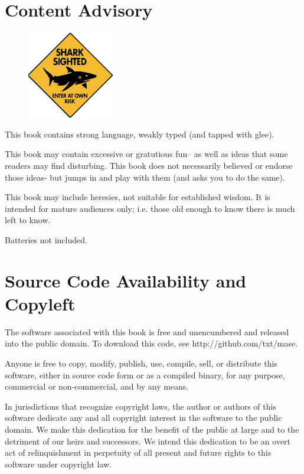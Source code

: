 \documentclass[9pt,twocolumn]{article}
\begin{document}
\tableofcontents

\newpage


\section*{Content Advisory }
\begin{figure}
  \includegraphics[width=1.5in]{img/shark.jpg}
  \end{figure}
This book contains strong language, weakly typed (and tapped with glee).

This book may contain excessive or gratutious fun--
as well as ideas that some readers may find disturbing.
This book does not necessarily 
believed or endorse those ideas- but jumps in and play with them
(and asks you to do the same).

This book may include heresies, not suitable for established wisdom. It is
intended for mature audiences only; i.e.  those
old enough to know there is much left to know. 

Batteries not included.

\section*{Source Code Availability and Copyleft}
The software associated with this book
is free and unencumbered and released into the public domain. To download this code, see http://github.com/txt/mase.

Anyone is free to copy, modify, publish, use, compile, sell, or
distribute this software, either in source code form or as a compiled
binary, for any purpose, commercial or non-commercial, and by any
means.

In jurisdictions that recognize copyright laws, the author or authors
of this software dedicate any and all copyright interest in the
software to the public domain. We make this dedication for the benefit
of the public at large and to the detriment of our heirs and
successors. We intend this dedication to be an overt act of
relinquishment in perpetuity of all present and future rights to this
software under copyright law.
\end{document}
